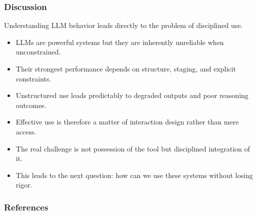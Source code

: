 \documentclass{beamer}
\begin{document}
\frame
{
   \frametitle{Discussion}

    Understanding LLM behavior leads directly to the problem of disciplined use.

    \begin{itemize}
        \item LLMs are powerful systems but they are inherently unreliable when unconstrained.
        \item Their strongest performance depends on structure, staging, and explicit constraints.
        \item Unstructured use leads predictably to degraded outputs and poor reasoning outcomes.
        \item Effective use is therefore a matter of interaction design rather than mere access.
        \item The real challenge is not possession of the tool but disciplined integration of it.
        \item This leads to the next question: how can we use these systems without losing rigor.
    \end{itemize}
}

\begin{frame}[t,allowframebreaks]
\frametitle{References}
\printbibliography
\end{frame}
\end{document}
